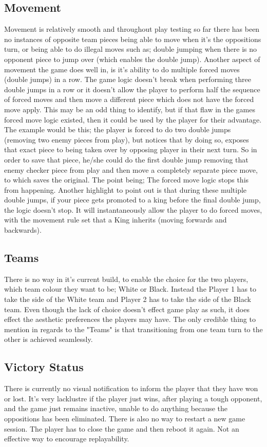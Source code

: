 \documentclass[10pt, a4paper]{article}
\begin{document}
	 \subsection{Movement}
	 Movement is relatively smooth and throughout play testing so far there has been no instances of opposite team pieces being able to move when it's the oppositions turn, or being able to do illegal moves such as; double jumping when there is no opponent piece to jump over (which enables the double jump). Another aspect of movement the game does well in, is it's ability to do multiple forced moves (double jumps) in a row. The game logic doesn't break when performing three double jumps in a row or it doesn't allow the player to perform half the sequence of forced moves and then move a different piece which does not have the forced move apply. This may be an odd thing to identify, but if that flaw in the games forced move logic existed, then it could be used by the player for their advantage. The example would be this; the player is forced to do two double jumps (removing two enemy pieces from play), but notices that by doing so, exposes that exact piece to being taken over by opposing player in their next turn. So in order to save that piece, he/she could do the first double jump removing that enemy checker piece from play and then move a completely separate piece move, to which saves the original. The point being; The forced move logic stops this from happening. Another highlight to point out is that during these multiple double jumps, if your piece gets promoted to a king before the final double jump, the logic doesn't stop. It will instantaneously allow the player to do forced moves, with the movement rule set that a King inherits (moving forwards and backwards).
	 
	 \subsection{Teams}
	 There is no way in it's current build, to enable the choice for the two players, which team colour they want to be; White or Black. Instead the Player 1 has to take the side of the White team and Player 2 has to take the side of the Black team. Even though the lack of choice doesn't effect game play as such, it does effect the aesthetic preferences the players may have. The only credible thing to mention in regards to the "Teams" is that transitioning from one team turn to the other is achieved seamlessly.
	 
	 \subsection{Victory Status}
	 There is currently no visual notification to inform the player that they have won or lost. It's very lacklustre if the player just wins, after playing a tough opponent, and the game just remains inactive, unable to do anything because the oppositions has been eliminated. There is also no way to restart a new game session. The player has to close the game and then reboot it again. Not an effective way to encourage replayability.
	 
\end{document}
